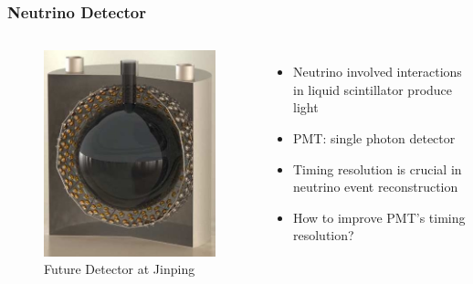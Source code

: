 \documentclass{beamer}
\begin{document}
\begin{frame}
\frametitle{Neutrino Detector}
\begin{columns}
\begin{figure}
    \centering
    \caption{Future Detector at Jinping}
    \includegraphics[width=1.0\linewidth]{img/DetectoratJinping.jpg}
\end{figure}
\begin{itemize}
    \item Neutrino involved interactions in liquid scintillator produce light
    \item PMT: single photon detector
    \item Timing resolution is crucial in neutrino event reconstruction
    \item How to improve PMT's timing resolution? 
\end{itemize}
\end{columns}
\end{frame}
\end{document}
